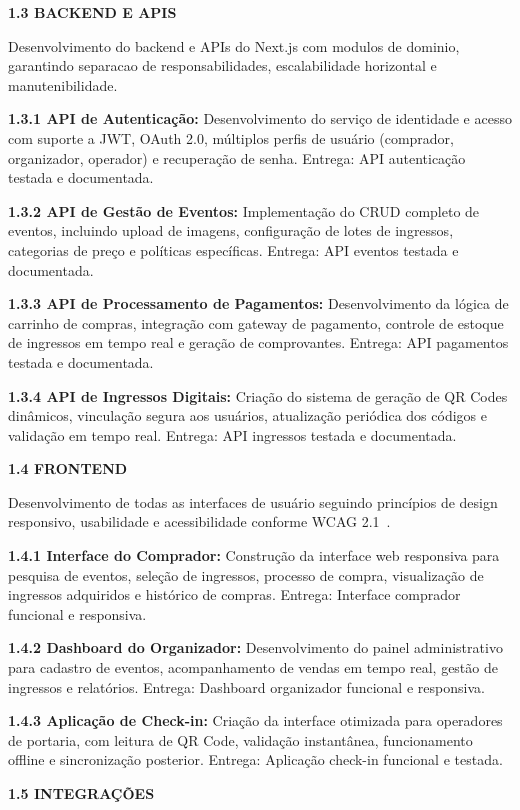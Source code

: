 \textbf{1.3 BACKEND E APIS}

Desenvolvimento do backend e APIs do Next.js com modulos de dominio, garantindo separacao de responsabilidades, escalabilidade horizontal e manutenibilidade.

\textbf{1.3.1 API de Autenticação:} Desenvolvimento do serviço de identidade e acesso com suporte a JWT, OAuth 2.0, múltiplos perfis de usuário (comprador, organizador, operador) e recuperação de senha. Entrega: API autenticação testada e documentada.

\textbf{1.3.2 API de Gestão de Eventos:} Implementação do CRUD completo de eventos, incluindo upload de imagens, configuração de lotes de ingressos, categorias de preço e políticas específicas. Entrega: API eventos testada e documentada.

\textbf{1.3.3 API de Processamento de Pagamentos:} Desenvolvimento da lógica de carrinho de compras, integração com gateway de pagamento, controle de estoque de ingressos em tempo real e geração de comprovantes. Entrega: API pagamentos testada e documentada.

\textbf{1.3.4 API de Ingressos Digitais:} Criação do sistema de geração de QR Codes dinâmicos, vinculação segura aos usuários, atualização periódica dos códigos e validação em tempo real. Entrega: API ingressos testada e documentada.

\textbf{1.4 FRONTEND}

Desenvolvimento de todas as interfaces de usuário seguindo princípios de design responsivo, usabilidade e acessibilidade conforme WCAG 2.1~\cite{WCAG:2018}.

\textbf{1.4.1 Interface do Comprador:} Construção da interface web responsiva para pesquisa de eventos, seleção de ingressos, processo de compra, visualização de ingressos adquiridos e histórico de compras. Entrega: Interface comprador funcional e responsiva.

\textbf{1.4.2 Dashboard do Organizador:} Desenvolvimento do painel administrativo para cadastro de eventos, acompanhamento de vendas em tempo real, gestão de ingressos e relatórios. Entrega: Dashboard organizador funcional e responsiva.

\textbf{1.4.3 Aplicação de Check-in:} Criação da interface otimizada para operadores de portaria, com leitura de QR Code, validação instantânea, funcionamento offline e sincronização posterior. Entrega: Aplicação check-in funcional e testada.

\textbf{1.5 INTEGRAÇÕES}

